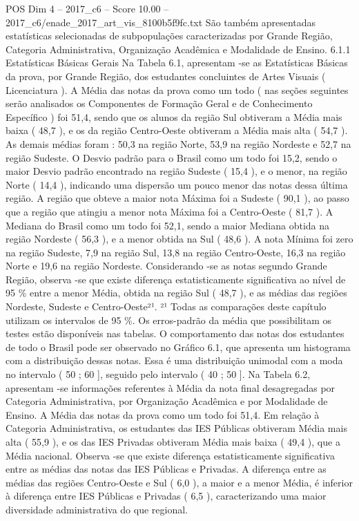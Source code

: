 \begin{textsample}{POS Dim 4 – 2017\_c6 – Score 10.00 – 2017\_c6/enade\_2017\_art\_vis\_8100b5f9fc.txt}
São também apresentadas estatísticas selecionadas de subpopulações caracterizadas por Grande Região, Categoria Administrativa, Organização Acadêmica e Modalidade de Ensino. 6.1.1 Estatísticas Básicas Gerais Na Tabela 6.1, apresentam -se as Estatísticas Básicas da prova, por Grande Região, dos estudantes concluintes de Artes Visuais ( Licenciatura ).
A Média das notas da prova como um todo ( nas seções seguintes serão analisados os Componentes de Formação Geral e de Conhecimento Específico ) foi 51,4, sendo que os alunos da região Sul obtiveram a Média mais baixa ( 48,7 ), e os da região Centro-Oeste obtiveram a Média mais alta ( 54,7 ).
As demais médias foram : 50,3 na região Norte, 53,9 na região Nordeste e 52,7 na região Sudeste.
O Desvio padrão para o Brasil como um todo foi 15,2, sendo o maior Desvio padrão encontrado na região Sudeste ( 15,4 ), e o menor, na região Norte ( 14,4 ), indicando uma dispersão um pouco menor das notas dessa última região.
A região que obteve a maior nota Máxima foi a Sudeste ( 90,1 ), ao passo que a região que atingiu a menor nota Máxima foi a Centro-Oeste ( 81,7 ).
A Mediana do Brasil como um todo foi 52,1, sendo a maior Mediana obtida na região Nordeste ( 56,3 ), e a menor obtida na Sul ( 48,6 ).
A nota Mínima foi zero na região Sudeste, 7,9 na região Sul, 13,8 na região Centro-Oeste, 16,3 na região Norte e 19,6 na região Nordeste.
Considerando -se as notas segundo Grande Região, observa -se que existe diferença estatisticamente significativa ao nível de 95 \% entre a menor Média, obtida na região Sul ( 48,7 ), e as médias das regiões Nordeste, Sudeste e Centro-Oeste²¹. ²¹ Todas as comparações deste capítulo utilizam os intervalos de 95 \%.
Os erros-padrão da média que possibilitam os testes estão disponíveis nas tabelas.
O comportamento das notas dos estudantes de todo o Brasil pode ser observado no Gráfico 6.1, que apresenta um histograma com a distribuição dessas notas.
Essa é uma distribuição unimodal com a moda no intervalo ( 50 ; 60 ], seguido pelo intervalo ( 40 ; 50 ].
Na Tabela 6.2, apresentam -se informações referentes à Média da nota final desagregadas por Categoria Administrativa, por Organização Acadêmica e por Modalidade de Ensino.
A Média das notas da prova como um todo foi 51,4.
Em relação à Categoria Administrativa, os estudantes das IES Públicas obtiveram Média mais alta ( 55,9 ), e os das IES Privadas obtiveram Média mais baixa ( 49,4 ), que a Média nacional.
Observa -se que existe diferença estatisticamente significativa entre as médias das notas das IES Públicas e Privadas.
A diferença entre as médias das regiões Centro-Oeste e Sul ( 6,0 ), a maior e a menor Média, é inferior à diferença entre IES Públicas e Privadas ( 6,5 ), caracterizando uma maior diversidade administrativa do que regional.

\end{textsample}
